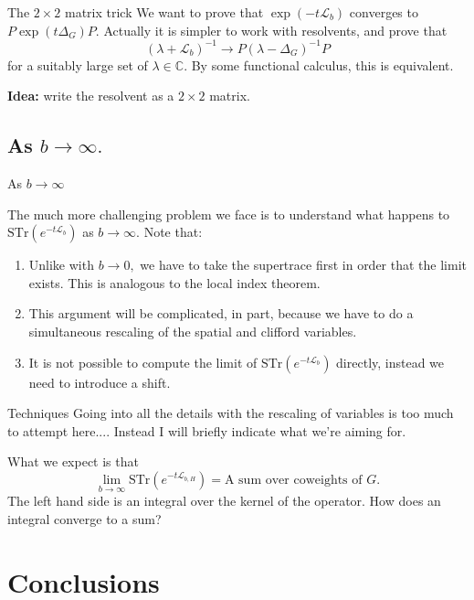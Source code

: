 \documentclass{beamer}
\numberwithin{equation}{section}
\theoremstyle{plain}
\theoremstyle{plain}
\theoremstyle{definition}
\theoremstyle{plain}
\theoremstyle{plain}
\theoremstyle{definition}
\newcommand{\Cplx}{\mathbb{C}}
\newcommand{\Lc}{\mathcal{L}}
\newcommand{\Str}{\mathrm{STr}}
\begin{document}
\begin{frame}{The $2\times 2$ matrix trick}
  We want to prove that $\exp(-t\Lc_b)$ converges to $P\exp(t\Delta_G)P.$ Actually it is simpler to work with resolvents, and prove that
  \[
    (\lambda+\Lc_b)^{-1} \rightarrow P(\lambda-\Delta_G)^{-1}P
  \]
  for a suitably large set of $\lambda\in \Cplx.$ By some functional calculus, this is equivalent. 
  
  \textbf{Idea:} write the resolvent as a $2\times 2$ matrix.
\end{frame}

\subsection{As $b\to \infty.$}

\begin{frame}
  \huge{As $b\to\infty$}
\end{frame}

\begin{frame}
  The much more challenging problem we face is to understand what happens to $\Str(e^{-t\Lc_b})$ as $b\to\infty.$
  Note that:
  \begin{enumerate}
    \item{} Unlike with $b\to 0,$ we have to take the supertrace first in order that the limit exists. This is analogous to the local index theorem. 
    \item{} This argument will be complicated, in part, because we have to do a simultaneous rescaling of the spatial and clifford variables.
    \item{} It is not possible to compute the limit of $\Str(e^{-t\Lc_b})$ directly, instead we need to introduce a shift.
  \end{enumerate}
\end{frame}

\begin{frame}{Techniques}
  Going into all the details with the rescaling of variables is too much to attempt here.... Instead I will briefly indicate what we're aiming for.
  
  What we expect is that
  \[
    \lim_{b\to\infty}\Str(e^{-t\Lc_{b,H}}) = \text{A sum over coweights of }G.
  \]
  The left hand side is an integral over the kernel of the operator. How does an integral converge to a sum?
\end{frame}

\section{Conclusions}
\end{document}

